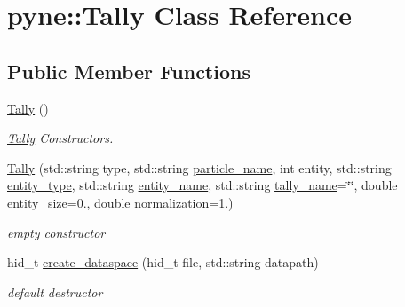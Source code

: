 \hypertarget{classpyne_1_1_tally}{}\section{pyne\+:\+:Tally Class Reference}
\label{classpyne_1_1_tally}
\subsection*{Public Member Functions}
\begin{DoxyCompactItemize}
\item 
\mbox{\label{classpyne_1_1_tally_ad4ad9718cbb925a293dd3450ab3245b0}} 
\hyperlink{classpyne_1_1_tally_ad4ad9718cbb925a293dd3450ab3245b0}{Tally} ()
\begin{DoxyCompactList}\small\item\em \hyperlink{classpyne_1_1_tally}{Tally} Constructors. \end{DoxyCompactList}\item 
\hyperlink{classpyne_1_1_tally_a882081e3a6f1628d1b7941003d5ccfad}{Tally} (std\+::string type, std\+::string \hyperlink{classpyne_1_1_tally_af79d35607aeb81e366f76ab75e2bfda0}{particle\+\_\+name}, int entity, std\+::string \hyperlink{classpyne_1_1_tally_a8b2e517c759ca71bc7b25c4de5a412f9}{entity\+\_\+type}, std\+::string \hyperlink{classpyne_1_1_tally_ac7892546a42be1385f0e805638a124b1}{entity\+\_\+name}, std\+::string \hyperlink{classpyne_1_1_tally_af5e75c809e337a06d26636020d3f1809}{tally\+\_\+name}=\char`\"{}\char`\"{}, double \hyperlink{classpyne_1_1_tally_a1a19c1b79ed25ea2a3d08b15b30bbea1}{entity\+\_\+size}=0., double \hyperlink{classpyne_1_1_tally_a8ff1eb44926ad1e415386983679c78f1}{normalization}=1.)
\begin{DoxyCompactList}\small\item\em empty constructor \end{DoxyCompactList}\item 
\mbox{\label{classpyne_1_1_tally_a5a0f19d9948855a18c2e8d10ddb96882}} 
hid\+\_\+t \hyperlink{classpyne_1_1_tally_a5a0f19d9948855a18c2e8d10ddb96882}{create\+\_\+dataspace} (hid\+\_\+t file, std\+::string datapath)
\begin{DoxyCompactList}\small\item\em default destructor \end{DoxyCompactList}\item 
\mbox{\label{classpyne_1_1_tally_affa61772b8a520ac428bdda9a262473b}} 

\end{DoxyCompactItemize}
